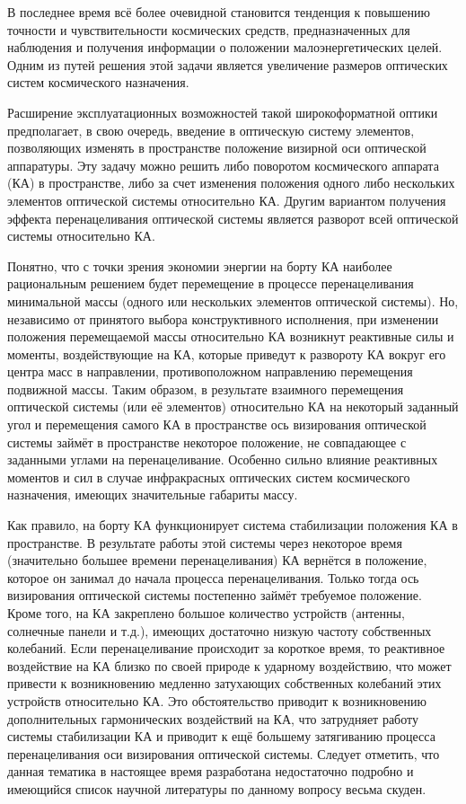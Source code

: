
{\actuality} В последнее время всё более очевидной становится тенденция к повышению точности и чувствительности космических средств, предназначенных для наблюдения и получения информации о положении малоэнергетических целей. Одним из путей решения этой задачи является увеличение размеров оптических систем космического назначения.

Расширение эксплуатационных возможностей такой широкоформатной оптики предполагает, в свою очередь, введение в оптическую систему элементов, позволяющих изменять в пространстве положение визирной оси оптической аппаратуры. Эту задачу можно решить либо поворотом космического аппарата (КА) в пространстве, либо за счет изменения положения одного либо нескольких элементов оптической системы относительно КА. Другим вариантом получения эффекта перенацеливания оптической системы является разворот всей оптической системы относительно КА.


Понятно, что с точки зрения экономии энергии на борту КА наиболее рациональным решением будет перемещение в процессе перенацеливания минимальной массы (одного или нескольких элементов оптической системы). Но, независимо от принятого выбора конструктивного исполнения, при изменении положения перемещаемой массы относительно КА возникнут реактивные силы и моменты, воздействующие на КА, которые приведут к развороту КА вокруг его центра масс в направлении, противоположном направлению перемещения подвижной массы. Таким образом, в результате взаимного перемещения оптической системы (или её элементов) относительно КА на некоторый заданный угол и перемещения самого КА в пространстве ось визирования оптической системы займёт в пространстве некоторое положение, не совпадающее с заданными углами на перенацеливание.  Особенно сильно влияние реактивных моментов и сил в случае инфракрасных оптических систем космического назначения, имеющих значительные габариты массу. 

Как правило, на борту КА функционирует система стабилизации положения КА в пространстве. В результате работы этой системы через некоторое время (значительно большее времени перенацеливания) КА вернётся в положение, которое он занимал до начала процесса перенацеливания. Только тогда ось визирования оптической системы постепенно займёт требуемое положение. Кроме того, на КА закреплено большое количество устройств (антенны, солнечные панели и т.д.), имеющих достаточно низкую частоту собственных колебаний. Если перенацеливание происходит за короткое время, то реактивное воздействие на КА близко по своей природе к ударному воздействию, что может привести к возникновению медленно затухающих собственных колебаний этих устройств относительно КА. Это обстоятельство приводит к возникновению дополнительных гармонических воздействий на КА, что затрудняет работу системы стабилизации КА и приводит к ещё большему затягиванию процесса перенацеливания оси визирования оптической системы.
Следует отметить, что данная тематика в настоящее время разработана недостаточно подробно и имеющийся список научной литературы по данному вопросу весьма скуден.

